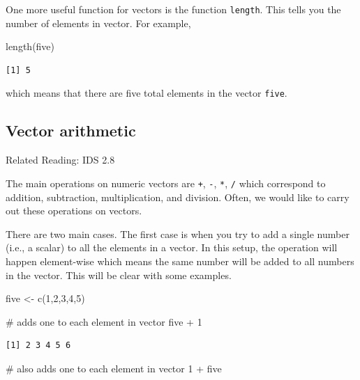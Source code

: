\documentclass[
  letterpaper,
  DIV=11,
  numbers=noendperiod]{scrreprt}
\newenvironment{Shaded}{\begin{snugshade}}{\end{snugshade}}
\newcommand{\CommentTok}[1]{\textcolor[rgb]{0.37,0.37,0.37}{#1}}
\newcommand{\DecValTok}[1]{\textcolor[rgb]{0.68,0.00,0.00}{#1}}
\newcommand{\FunctionTok}[1]{\textcolor[rgb]{0.28,0.35,0.67}{#1}}
\newcommand{\NormalTok}[1]{\textcolor[rgb]{0.00,0.23,0.31}{#1}}
\newcommand{\OtherTok}[1]{\textcolor[rgb]{0.00,0.23,0.31}{#1}}
\newcommand{\SpecialCharTok}[1]{\textcolor[rgb]{0.37,0.37,0.37}{#1}}
\begin{document}
One more useful function for vectors is the function \texttt{length}.
This tells you the number of elements in vector. For example,

\begin{Shaded}
\begin{Highlighting}[]
\FunctionTok{length}\NormalTok{(five)}
\end{Highlighting}
\end{Shaded}

\begin{verbatim}
[1] 5
\end{verbatim}

which means that there are five total elements in the vector
\texttt{five}.

\subsection{Vector arithmetic}\label{vector-arithmetic}

Related Reading: IDS 2.8

The main operations on numeric vectors are \texttt{+}, \texttt{-},
\texttt{*}, \texttt{/} which correspond to addition, subtraction,
multiplication, and division. Often, we would like to carry out these
operations on vectors.

There are two main cases. The first case is when you try to add a single
number (i.e., a scalar) to all the elements in a vector. In this setup,
the operation will happen element-wise which means the same number will
be added to all numbers in the vector. This will be clear with some
examples.

\begin{Shaded}
\begin{Highlighting}[]
\NormalTok{five }\OtherTok{\textless{}{-}} \FunctionTok{c}\NormalTok{(}\DecValTok{1}\NormalTok{,}\DecValTok{2}\NormalTok{,}\DecValTok{3}\NormalTok{,}\DecValTok{4}\NormalTok{,}\DecValTok{5}\NormalTok{)}

\CommentTok{\# adds one to each element in vector}
\NormalTok{five }\SpecialCharTok{+} \DecValTok{1}
\end{Highlighting}
\end{Shaded}

\begin{verbatim}
[1] 2 3 4 5 6
\end{verbatim}

\begin{Shaded}
\begin{Highlighting}[]
\CommentTok{\# also adds one to each element in vector}
\DecValTok{1} \SpecialCharTok{+}\NormalTok{ five}
\end{Highlighting}
\end{Shaded}
\end{document}
